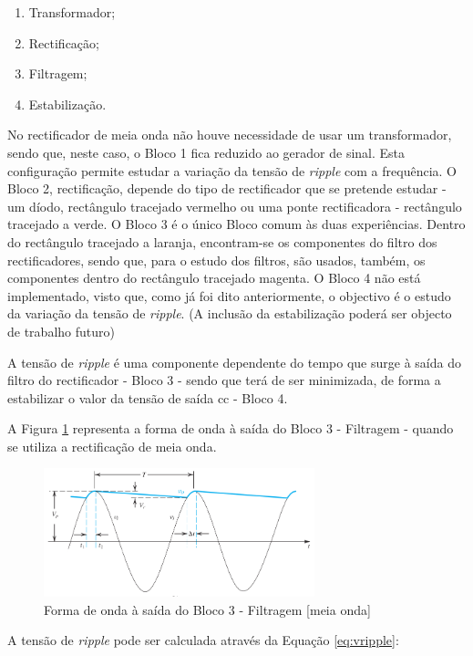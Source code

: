 \begin{enumerate}
	\item Transformador;
	\item Rectificação;
	\item Filtragem;
	\item Estabilização.
\end{enumerate}

No rectificador de meia onda não houve necessidade de usar um transformador, sendo que, neste caso, o Bloco 1 fica reduzido ao gerador de sinal. Esta configuração permite estudar a variação da tensão de \textit{ripple} com a frequência. O Bloco 2, rectificação, depende do tipo de rectificador que se pretende estudar - um díodo, rectângulo tracejado vermelho ou uma ponte rectificadora - rectângulo tracejado a verde. O Bloco 3 é o único Bloco comum às duas experiências. Dentro do rectângulo tracejado a laranja, encontram-se os componentes do filtro dos rectificadores, sendo que, para o estudo dos filtros, são usados, também, os componentes dentro do rectângulo tracejado magenta. O Bloco 4 não está implementado, visto que, como já foi dito anteriormente, o objectivo é o estudo da variação da tensão de \textit{ripple}. (A inclusão da estabilização poderá ser objecto de trabalho futuro)

A tensão de \textit{ripple} é uma componente dependente do tempo que surge à saída do filtro do rectificador - Bloco 3 - sendo que terá de ser minimizada, de forma a estabilizar o valor da tensão de saída \acrshort{cc} - Bloco 4. \cite{sedrasmith} 

A Figura \ref{fig:sedraripple} representa a forma de onda à saída do Bloco 3 - Filtragem - quando se utiliza a rectificação de meia onda.
\begin{figure}[hbtp]
	\centering
	\includegraphics[width=0.7\textwidth]{figures/sedra_ripple.png}
	\caption{Forma de onda à saída do Bloco 3 - Filtragem [meia onda] \cite{sedrasmith}}
	\label{fig:sedraripple}
\end{figure}

A tensão de \textit{ripple} pode ser calculada através da Equação \ref{eq:vripple}:

